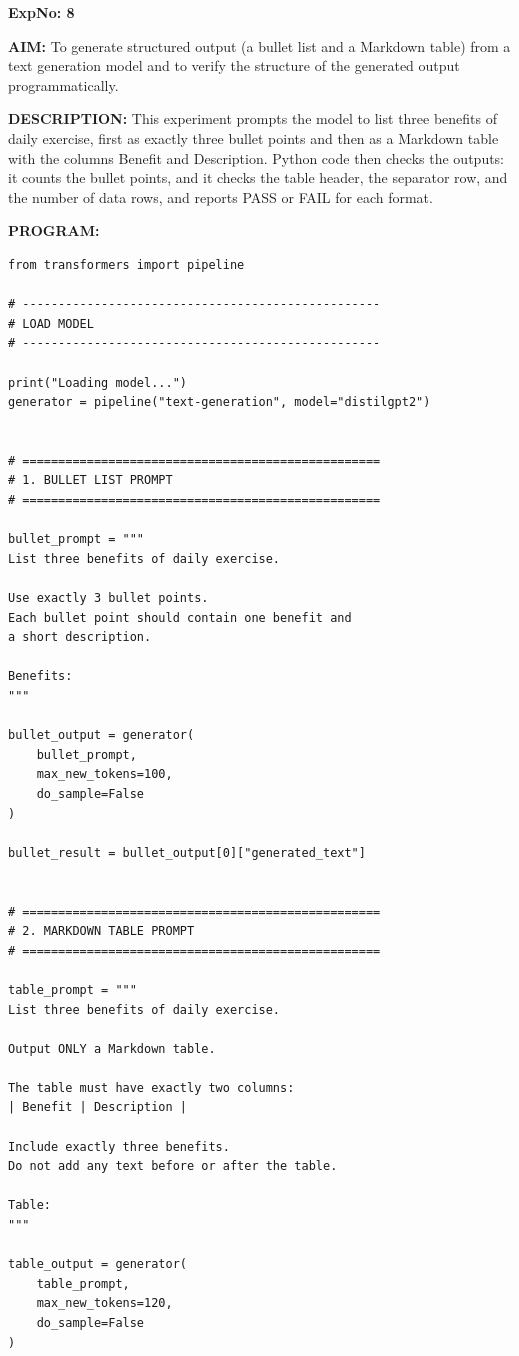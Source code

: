 \documentclass[10pt,a4paper]{article}
\newcommand{\code}[1]{{\ttfamily\hyphenchar\font=-1 #1}}
\newcommand{\sectionlabel}[1]{\par\vspace{3pt}\noindent\textbf{#1}\par\nopagebreak}
\begin{document}
\clearpage

\noindent\textbf{ExpNo: 8}

\noindent\textbf{AIM:} To generate structured output (a bullet list and a Markdown table) from a text generation model and to verify the structure of the generated output programmatically.

\noindent\textbf{DESCRIPTION:} This experiment prompts the model to list three benefits of daily exercise, first as exactly three bullet points and then as a Markdown table with the columns \code{Benefit} and \code{Description}. Python code then checks the outputs: it counts the bullet points, and it checks the table header, the separator row, and the number of data rows, and reports PASS or FAIL for each format.

\sectionlabel{PROGRAM:}
\begin{lstlisting}[style=code]
from transformers import pipeline

# --------------------------------------------------
# LOAD MODEL
# --------------------------------------------------

print("Loading model...")
generator = pipeline("text-generation", model="distilgpt2")


# ==================================================
# 1. BULLET LIST PROMPT
# ==================================================

bullet_prompt = """
List three benefits of daily exercise.

Use exactly 3 bullet points.
Each bullet point should contain one benefit and
a short description.

Benefits:
"""

bullet_output = generator(
    bullet_prompt,
    max_new_tokens=100,
    do_sample=False
)

bullet_result = bullet_output[0]["generated_text"]


# ==================================================
# 2. MARKDOWN TABLE PROMPT
# ==================================================

table_prompt = """
List three benefits of daily exercise.

Output ONLY a Markdown table.

The table must have exactly two columns:
| Benefit | Description |

Include exactly three benefits.
Do not add any text before or after the table.

Table:
"""

table_output = generator(
    table_prompt,
    max_new_tokens=120,
    do_sample=False
)


\end{lstlisting}
\end{document}
